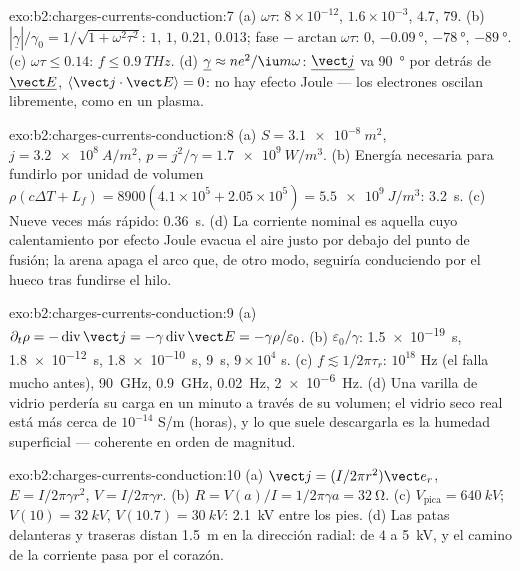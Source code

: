 \begin{solution}{exo:b2:charges-currents-conduction:7}
(a) $\omega\tau$: $8 \times 10^{-12}$, $1.6 \times 10^{-3}$, $4.7$, $79$. (b) $|\underline\gamma|/\gamma_0 =
1/\sqrt{1 + \omega^2\tau^2}$: $1$, $1$, $0.21$, $0.013$; fase $-\arctan\omega\tau$: $0$,
$-\qty{0.09}{\degree}$, $-\qty{78}{\degree}$, $-\qty{89}{\degree}$. (c) $\omega\tau \le 0.14$: $f \le
\qty{0.9}{THz}$. (d) $\underline\gamma \approx ne^2/\iu m\omega$: $\underline{\vect j}$ va
\qty{90}{\degree} por detrás de $\underline{\vect E}$, $\langle\vect j\cdot\vect E\rangle = 0$: no hay
efecto Joule --- los electrones oscilan libremente, como en un plasma.
\end{solution}

\begin{solution}{exo:b2:charges-currents-conduction:8}
(a) $S = \qty{3.1e-8}{m^2}$, $j = \qty{3.2e8}{A/m^2}$, $p = j^2/\gamma = \qty{1.7e9}{W/m^3}$.
(b) Energía necesaria para fundirlo por unidad de volumen $\rho(c\Delta T + L_f) = 8900(4.1 \times 10^5 + 2.05 \times
10^5) = \qty{5.5e9}{J/m^3}$: \qty{3.2}{s}. (c) Nueve veces más rápido: \qty{0.36}{s}. (d) La
corriente nominal es aquella cuyo calentamiento por efecto Joule evacua el
aire justo por debajo del punto de fusión; la arena apaga el arco que, de
otro modo, seguiría conduciendo por el hueco tras fundirse el hilo.
\end{solution}

\begin{solution}{exo:b2:charges-currents-conduction:9}
(a) $\partial_t\rho = -\operatorname{div}\vect j = -\gamma\operatorname{div}\vect E = -\gamma\rho/
\varepsilon_0$. (b) $\varepsilon_0/\gamma$: \qty{1.5e-19}{s}, \qty{1.8e-12}{s}, \qty{1.8e-10}{s},
\qty{9}{s}, $9 \times 10^4$ s. (c) $f \lesssim 1/2\pi\tau_r$: $10^{18}$ Hz (el 
falla mucho antes), \qty{90}{GHz}, \qty{0.9}{GHz}, \qty{0.02}{Hz}, \qty{2e-6}{Hz}. (d)
Una varilla de vidrio perdería su carga en un minuto a través de su
volumen; el vidrio seco real está más cerca de $10^{-14}$ S/m (horas), y lo
que suele descargarla es la humedad superficial --- coherente en orden de
magnitud.
\end{solution}

\begin{solution}{exo:b2:charges-currents-conduction:10}
(a) $\vect j = (I/2\pi r^2)\vect e_r$, $E = I/2\pi\gamma r^2$, $V = I/2\pi\gamma r$. (b) $R = V(a)
/I = 1/2\pi\gamma a = \qty{32}{\ohm}$. (c) $V_{\text{pica}} = \qty{640}{kV}$; $V(10) = \qty{32}{kV}$,
$V(10.7) = \qty{30}{kV}$: \qty{2.1}{kV} entre los pies. (d) Las patas
delanteras y traseras distan \qty{1.5}{m} en la dirección radial: de $4$ a
\qty{5}{kV}, y el camino de la corriente pasa por el corazón.
\end{solution}

